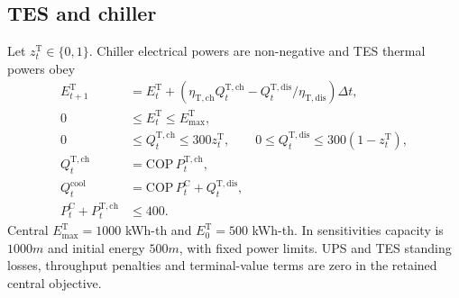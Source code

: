 \subsection{TES and chiller}
Let $z_t^{\mathrm T}\in\{0,1\}$. Chiller electrical powers are non-negative and TES thermal powers obey
\begin{align}
E_{t+1}^{\mathrm T}&=E_t^{\mathrm T}+\left(\eta_{\mathrm{T,ch}}Q_t^{\mathrm{T,ch}}-
Q_t^{\mathrm{T,dis}}/\eta_{\mathrm{T,dis}}\right)\Delta t,\\
0&\leq E_t^{\mathrm T}\leq E_{\max}^{\mathrm T},\\
0&\leq Q_t^{\mathrm{T,ch}}\leq300z_t^{\mathrm T},\qquad
0\leq Q_t^{\mathrm{T,dis}}\leq300(1-z_t^{\mathrm T}),\\
Q_t^{\mathrm{T,ch}}&=\mathrm{COP}\,P_t^{\mathrm{T,ch}},\\
Q_t^{\mathrm{cool}}&=\mathrm{COP}\,P_t^{\mathrm C}+Q_t^{\mathrm{T,dis}},\\
P_t^{\mathrm C}+P_t^{\mathrm{T,ch}}&\leq400.
\end{align}
Central $E_{\max}^{\mathrm T}=1000$ kWh-th and $E_0^{\mathrm T}=500$ kWh-th. In sensitivities capacity is $1000m$ and initial energy $500m$, with fixed power limits. UPS and TES standing losses, throughput penalties and terminal-value terms are zero in the retained central objective.

